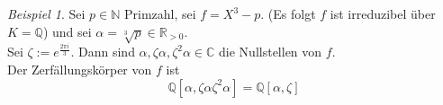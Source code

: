 \documentclass[10pt,a4paper]{article}
\newcommand{\N}{\ensuremath{\mathbb{N}}}
\newcommand{\Q}{\ensuremath{\mathbb{Q}}}
\newcommand{\R}{\ensuremath{\mathbb{R}}}
\newcommand{\C}{\ensuremath{\mathbb{C}}}
\newcommand{\al}{\ensuremath{\alpha}}
\newcounter{thm}[section]
\theoremstyle{definition}
\theoremstyle{plain}
\theoremstyle{remark}
\newtheorem{exm}[thm]{Beispiel}
\begin{document}
\begin{exm}
	Sei $p\in\N$ Primzahl, sei $f=X^3-p$. (Es folgt $f$ ist irreduzibel über $K=\Q$) und sei $\al=\sqrt[3]{p}\in\R_{>0}$.\\
	Sei $\zeta:=e^{\frac{2\pi i}{3}}$. Dann sind $\al,\zeta\al,\zeta^2\al\in\C$ die Nullstellen von $f$.\\
	Der Zerfällungskörper von $f$ ist
	\[\Q[\al,\zeta\al\zeta^2\al]=\Q[\al,\zeta]\]
\end{exm}
\end{document}
